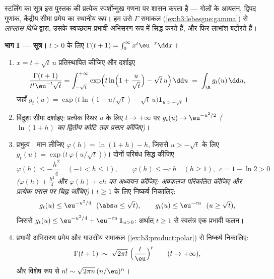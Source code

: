 \begin{problem}
\label{pb:b3:product:1}
स्टर्लिंग का सूत्र इस पुस्तक की प्रत्येक स्पर्शोन्मुख गणना पर
शासन करता है --- गोलों के आयतन, द्विपद गुणांक, केंद्रीय सीमा
प्रमेय का स्थानीय रूप। हम उसे $\Gamma$ समाकल (\cref{ex:b3:lebesgue:gamma}) से
\emph{लाप्लास विधि} द्वारा, उसके स्वच्छतम प्रभावी-अभिसरण रूप में
सिद्ध करते हैं, और फिर लाभांश बटोरते हैं।

\medskip
\noindent\textbf{भाग I --- सूत्र।} $t > 0$ के लिए $\Gamma(t + 1) = \int_0^\infty x^{t}\eu^{-x}\dd x$।
\begin{enumerate}
  \item $x = t + \sqrt t\,u$ प्रतिस्थापित कीजिए और दर्शाइए
        \[
        \frac{\Gamma(t+1)}{t^{t}\eu^{-t}\sqrt t}
        = \int_{-\sqrt t}^{+\infty}
        \exp\Bigl(t\ln\Bigl(1 + \frac u{\sqrt
        t}\Bigr) - \sqrt t\,u\Bigr)\,\dd u
        \;=\;\int_\R g_t(u)\,\dd u,
        \]
        जहाँ $g_t(u) = \exp\bigl(t\ln(1 + u/\sqrt t) -
        \sqrt t\,u\bigr)\mathbf 1_{u > -\sqrt t}$।
  \item बिंदुशः सीमा दर्शाइए: प्रत्येक स्थिर $u$ के लिए $t \to +\infty$
        पर $g_t(u)
        \to \eu^{-u^2/2}$ \emph{($\ln(1 + h)$ का द्वितीय कोटि तक प्रसार कीजिए)}।
  \item प्रभुत्व। मान लीजिए $\varphi(h) = \ln(1 + h) - h$, जिससे $u > -\sqrt t$ के लिए $g_t(u) = \exp\bigl(t\,\varphi(u/\sqrt t)\bigr)$।
        दोनों परिबंध सिद्ध कीजिए
        \[
        \varphi(h) \leq -\frac{h^2}4 \quad (-1 < h \leq 1),
        \qquad
        \varphi(h) \leq -c\,h \quad (h \geq 1),\ \ c = 1 -
        \ln 2 > 0
        \]
        \emph{($\varphi(h) + \frac{h^2}4$ और $\varphi(h)
        + ch$ का अध्ययन कीजिए: अवकलज परिकलित
        कीजिए और प्रत्येक परास पर चिह्न जाँचिए)}। $t \geq 1$ के लिए
        निष्कर्ष निकालिए:
        \[
        g_t(u) \leq \eu^{-u^2/4}\ \ (\abs u \leq \sqrt t),
        \qquad
        g_t(u) \leq \eu^{-cu}\ \ (u \geq \sqrt t),
        \]
        जिससे $g_t(u) \leq \eu^{-u^2/4} +
        \eu^{-cu}\,\mathbf 1_{u > 0}$: अर्थात् $t \geq 1$ से स्वतंत्र एक 
        प्रभावी फलन।
  \item प्रभावी अभिसरण प्रमेय और गाउसीय समाकल (\cref{ex:b3:product:polar}) से निष्कर्ष
        निकालिए:
        \[
        \Gamma(t + 1) \;\sim\;
        \sqrt{2\pi t}\;\Bigl(\frac t\eu\Bigr)^{t}
        \qquad (t \to +\infty),
        \]
        और विशेष रूप से $n! \sim \sqrt{2\pi
        n}\,(n/\eu)^n$।
\end{enumerate}


\end{problem}
